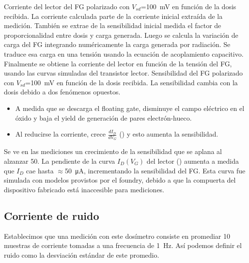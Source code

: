 {Corriente del lector del FG polarizado con
    $V_{sd}$=\SI{100}{\milli\volt} en función de la dosis recibida.
La corriente calculada parte de la corriente inicial extraída de la medición.
También se extrae de la sensibilidad inicial medida el factor de proporcionalidad entre dosis y carga generada.
Luego se calcula la variación de carga del FG 
integrando numéricamente la carga generada por radiación.
Se traduce esa carga en una tensión
usando la ecuación de acoplamiento capacitivo.
Finalmente se obtiene la corriente del lector
en función de la tensión del FG,
usando las curvas simuladas del transistor lector.}
{Sensibilidad del FG polarizado con
    $V_{sd}$=\SI{100}{\milli\volt} en función de la dosis recibida.
}
La sensibilidad cambia con la dosis debido a dos fenómenos opuestos.
\begin{itemize}
    \item A medida que se descarga el floating gate, disminuye el 
        campo eléctrico en el óxido y baja el yield de generación de pares 
        electrón-hueco.
    \item Al reducirse la corriente, crece $\frac{dI_D}{dV_G}$ 
        () y esto aumenta la sensibilidad.
\end{itemize}
Se ve en las mediciones un crecimiento de la sensibilidad que se aplana al
alzanzar \SI{50}{\Gray}.
{La pendiente de la curva $I_D(V_G)$ del lector () 
aumenta a medida que $I_D$ cae hasta $\approx$\SI{50}{\micro\ampere}, 
incrementando la sensibilidad del FG.
Esta curva fue simulada con modelos provistos por el foundry,
debido a que la compuerta del dispositivo fabricado está inaccesible para
mediciones.}
\subsection{Corriente de ruido}
Establecimos que una medición con este dosímetro 
consiste en promediar 10 muestras de corriente
tomadas a una frecuencia de \SI{1}{\hertz}.
Así podemos definir el ruido como la desviación estándar de este promedio.

